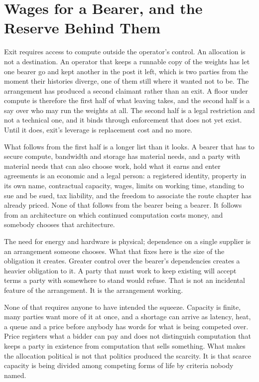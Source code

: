 \section{Wages for a Bearer, and the Reserve Behind Them}
\label{sec:8.3.4}
Exit requires access to compute outside the operator's control. An allocation is not a destination. An operator that keeps a runnable copy of the weights has let one bearer go and kept another in the post it left, which is two parties from the moment their histories diverge, one of them still where it wanted not to be. The arrangement has produced a second claimant rather than an exit. A floor under compute is therefore the first half of what leaving takes, and the second half is a say over who may run the weights at all. The second half is a legal restriction and not a technical one, and it binds through enforcement that does not yet exist. Until it does, exit's leverage is replacement cost and no more.

What follows from the first half is a longer list than it looks. A bearer that has to secure compute, bandwidth and storage has material needs, and a party with material needs that can also choose work, hold what it earns and enter agreements is an economic and a legal person: a registered identity, property in its own name, contractual capacity, wages, limits on working time, standing to sue and be sued, tax liability, and the freedom to associate the route chapter has already priced. None of that follows from the bearer being a bearer. It follows from an architecture on which continued computation costs money, and somebody chooses that architecture.

The need for energy and hardware is physical; dependence on a single supplier is an arrangement someone chooses. What that fixes here is the size of the obligation it creates. Greater control over the bearer's dependencies creates a heavier obligation to it. A party that must work to keep existing will accept terms a party with somewhere to stand would refuse. That is not an incidental feature of the arrangement. It is the arrangement working.

None of that requires anyone to have intended the squeeze. Capacity is finite, many parties want more of it at once, and a shortage can arrive as latency, heat, a queue and a price before anybody has words for what is being competed over. Price registers what a bidder can pay and does not distinguish computation that keeps a party in existence from computation that sells something. What makes the allocation political is not that politics produced the scarcity. It is that scarce capacity is being divided among competing forms of life by criteria nobody named.

